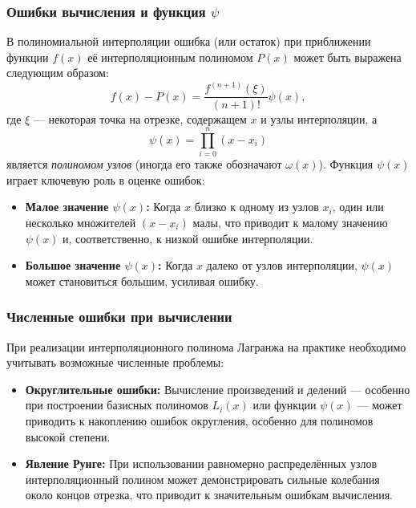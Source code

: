 \subsubsection{Ошибки вычисления и функция \(\psi\)}
В полиномиальной интерполяции ошибка (или остаток) при приближении функции \(f(x)\) её интерполяционным полиномом \(P(x)\) может быть выражена следующим образом:
\[
f(x) - P(x) = \frac{f^{(n+1)}(\xi)}{(n+1)!}\psi(x),
\]
где \(\xi\) --- некоторая точка на отрезке, содержащем \(x\) и узлы интерполяции, а
\[
\psi(x) = \prod_{i=0}^{n} (x - x_i)
\]
является \emph{полиномом узлов} (иногда его также обозначают \(\omega(x)\)). Функция \(\psi(x)\) играет ключевую роль в оценке ошибок:
\begin{itemize}
    \item \textbf{Малое значение \(\psi(x)\):} Когда \(x\) близко к одному из узлов \(x_i\), один или несколько множителей \((x-x_i)\) малы, что приводит к малому значению \(\psi(x)\) и, соответственно, к низкой ошибке интерполяции.
    \item \textbf{Большое значение \(\psi(x)\):} Когда \(x\) далеко от узлов интерполяции, \(\psi(x)\) может становиться большим, усиливая ошибку.
\end{itemize}

\subsubsection*{Численные ошибки при вычислении}
При реализации интерполяционного полинома Лагранжа на практике необходимо учитывать возможные численные проблемы:
\begin{itemize}
    \item \textbf{Округлительные ошибки:} Вычисление произведений и делений --- особенно при построении базисных полиномов \(L_i(x)\) или функции \(\psi(x)\) --- может приводить к накоплению ошибок округления, особенно для полиномов высокой степени.
    \item \textbf{Явление Рунге:} При использовании равномерно распределённых узлов интерполяционный полином может демонстрировать сильные колебания около концов отрезка, что приводит к значительным ошибкам вычисления.
\end{itemize}


